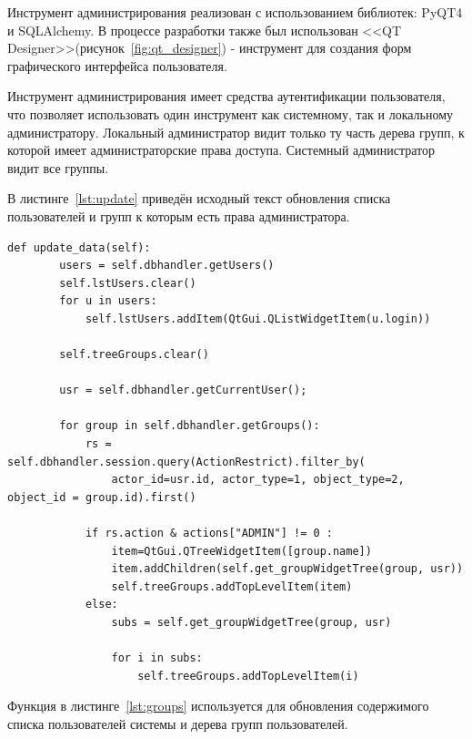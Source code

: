 \documentclass[utf8,usehyperref,12pt]{G7-32}
\begin{document}
Инструмент администрирования реализован с использованием библиотек: PyQT4\cite{pyqt4_ref} и SQLAlchemy\cite{sqlalchemy}. В процессе разработки также был использован <<QT Designer>>(рисунок~\ref{fig:qt_designer}) - инструмент для создания форм графического интерфейса пользователя.
 
Инструмент администрирования имеет средства аутентификации пользователя, что позволяет использовать один инструмент как системному, так и локальному администратору. Локальный администратор видит только ту часть дерева групп, к которой имеет администраторские права доступа. Системный администратор видит все группы.

В листинге~\ref{lst:update} приведён исходный текст обновления списка пользователей и групп к которым есть права администратора. 

\lstset{language=Python,caption=Обновление данных в графическом интерфейсе,label=lst:update}
\begin{lstlisting}
def update_data(self):
        users = self.dbhandler.getUsers()
        self.lstUsers.clear()
        for u in users:
            self.lstUsers.addItem(QtGui.QListWidgetItem(u.login))                
        
        self.treeGroups.clear()
        
        usr = self.dbhandler.getCurrentUser();
        
        for group in self.dbhandler.getGroups():            
            rs = self.dbhandler.session.query(ActionRestrict).filter_by(
            	actor_id=usr.id, actor_type=1, object_type=2, object_id = group.id).first()
            	
            if rs.action & actions["ADMIN"] != 0 :
                item=QtGui.QTreeWidgetItem([group.name])
                item.addChildren(self.get_groupWidgetTree(group, usr))
                self.treeGroups.addTopLevelItem(item)
            else:
                subs = self.get_groupWidgetTree(group, usr)
                
                for i in subs:
                    self.treeGroups.addTopLevelItem(i)
\end{lstlisting}

Функция в листинге~\ref{lst:groups} используется для обновления содержимого списка пользователей системы и дерева групп пользователей. 
\end{document}
